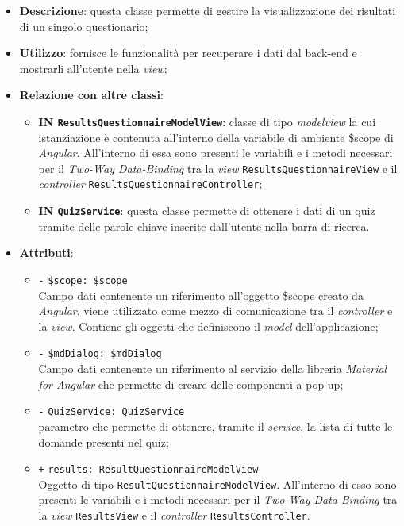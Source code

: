 \begin{itemize}
	\item \textbf{Descrizione}: questa classe permette di gestire la visualizzazione dei risultati di un singolo questionario;
	\item \textbf{Utilizzo}: fornisce le funzionalità per recuperare i dati dal back-end e mostrarli all'utente nella \textit{view};
	\item \textbf{Relazione con altre classi}:
	\begin{itemize}
		\item \textbf{IN \texttt{ResultsQuestionnaireModelView}}: classe di tipo \textit{modelview} la cui istanziazione è contenuta all'interno della variabile di ambiente \$scope di \textit{Angular}. All'interno di essa sono presenti le variabili e i metodi necessari per il \textit{Two-Way Data-Binding} tra la \textit{view} \texttt{ResultsQuestionnaireView} e il \textit{controller} \texttt{ResultsQuestionnaireController}; 
		\item \textbf{IN \texttt{QuizService}}: questa classe permette di ottenere i dati di un quiz tramite delle parole chiave inserite dall'utente nella barra di ricerca.
	\end{itemize}
	\item \textbf{Attributi}:
	\begin{itemize}
		\item \texttt{-} \texttt{\$scope: \$scope} \\
		Campo dati contenente un riferimento all'oggetto \$scope creato da \textit{Angular}, viene utilizzato come mezzo di comunicazione tra il \textit{controller} e la \textit{view}. Contiene gli oggetti che definiscono il \textit{model} dell'applicazione;
		\item \texttt{-} \texttt{\$mdDialog: \$mdDialog} \\
		Campo dati contenente un riferimento al servizio della libreria \textit{Material for Angular} che permette di creare delle componenti a pop-up;
		\item \texttt{-} \texttt{QuizService: QuizService}\\ parametro che permette di ottenere, tramite il \textit{service}, la lista di tutte le domande presenti nel quiz;
		\item \texttt{+} \texttt{results: ResultQuestionnaireModelView} \\
		Oggetto di tipo \texttt{ResultQuestionnaireModelView}. All'interno di esso sono presenti le variabili e i metodi necessari per il \textit{Two-Way Data-Binding} tra la \textit{view} \texttt{ResultsView} e il \textit{controller} \texttt{ResultsController}.

\end{itemize}
\end{itemize}
